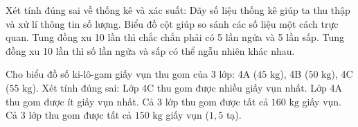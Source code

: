 \begin{ex} %
Xét tính đúng sai về thống kê và xác suất:
\choiceTF
{\True Dãy số liệu thống kê giúp ta thu thập và xử lí thông tin số lượng.}
{\True Biểu đồ cột giúp so sánh các số liệu một cách trực quan.}
{Tung đồng xu 10 lần thì chắc chắn phải có 5 lần ngửa và 5 lần sấp.}
{\True Tung đồng xu 10 lần thì số lần ngửa và sấp có thể ngẫu nhiên khác nhau.}
\end{ex}

\begin{ex} %
Cho biểu đồ số ki-lô-gam giấy vụn thu gom của 3 lớp: 4A ($45\text{ kg}$), 4B ($50\text{ kg}$), 4C ($55\text{ kg}$). Xét tính đúng sai:
\choiceTF
{\True Lớp 4C thu gom được nhiều giấy vụn nhất.}
{\True Lớp 4A thu gom được ít giấy vụn nhất.}
{Cả 3 lớp thu gom được tất cả $160\text{ kg}$ giấy vụn.}
{\True Cả 3 lớp thu gom được tất cả $150\text{ kg}$ giấy vụn ($1{,}5$ tạ).}
\end{ex}

